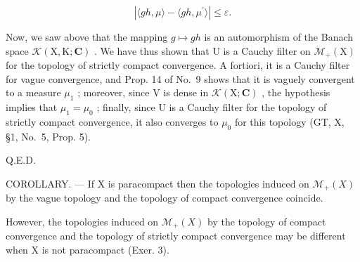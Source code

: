 \[
| \langle g h, \mu \rangle - \langle g h, \mu^ {\prime} \rangle | \leqslant \varepsilon .
\]

Now, we saw above that the mapping \(g \mapsto gh\) is an automorphism of the Banach space \(\mathcal{K}(\mathrm{X},\mathrm{K};\mathbf{C})\) . We have thus shown that U is a Cauchy filter on \(\mathcal{M}_{+}(\mathrm{X})\) for the topology of strictly compact convergence. A fortiori, it is a Cauchy filter for vague convergence, and Prop. 14 of No.~9 shows that it is vaguely convergent to a measure \(\mu_{1}\) ; moreover, since V is dense in \(\mathcal{K}(\mathrm{X};\mathbf{C})\) , the hypothesis implies that \(\mu_{1} = \mu_{0}\) ; finally, since U is a Cauchy filter for the topology of strictly compact convergence, it also converges to \(\mu_{0}\) for this topology (GT, X, §1, No.~5, Prop. 5).

Q.E.D.

COROLLARY. --- If X is paracompact then the topologies induced on \(\mathcal{M}_{+}(X)\) by the vague topology and the topology of compact convergence coincide.

However, the topologies induced on \(\mathcal{M}_{+}(X)\) by the topology of compact convergence and the topology of strictly compact convergence may be different when X is not paracompact (Exer. 3).

